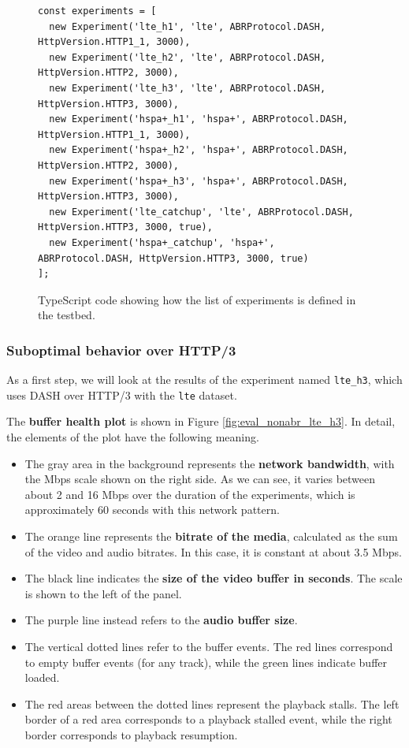 \begin{figure}[h]
    \centering
    \begin{verbatim}
const experiments = [
  new Experiment('lte_h1', 'lte', ABRProtocol.DASH, HttpVersion.HTTP1_1, 3000),
  new Experiment('lte_h2', 'lte', ABRProtocol.DASH, HttpVersion.HTTP2, 3000),
  new Experiment('lte_h3', 'lte', ABRProtocol.DASH, HttpVersion.HTTP3, 3000),
  new Experiment('hspa+_h1', 'hspa+', ABRProtocol.DASH, HttpVersion.HTTP1_1, 3000),
  new Experiment('hspa+_h2', 'hspa+', ABRProtocol.DASH, HttpVersion.HTTP2, 3000),
  new Experiment('hspa+_h3', 'hspa+', ABRProtocol.DASH, HttpVersion.HTTP3, 3000),
  new Experiment('lte_catchup', 'lte', ABRProtocol.DASH, HttpVersion.HTTP3, 3000, true),
  new Experiment('hspa+_catchup', 'hspa+', ABRProtocol.DASH, HttpVersion.HTTP3, 3000, true)
];
    \end{verbatim}
    \caption{TypeScript code showing how the list of experiments is defined in the testbed.}
    \label{fig:experiments1}
\end{figure}

\subsubsection{Suboptimal behavior over HTTP/3}
\label{sec:eval/non-abr/h3-behavior}

As a first step, we will look at the results of the experiment named \texttt{lte\_h3}, which uses DASH over HTTP/3 with the \texttt{lte} dataset.

The \textbf{buffer health plot} is shown in Figure \ref{fig:eval_nonabr_lte_h3}. In detail, the elements of the plot have the following meaning.

\begin{itemize}
    \item The gray area in the background represents the \textbf{network bandwidth}, with the Mbps scale shown on the right side. As we can see, it varies between about 2 and 16 Mbps over the duration of the experiments, which is approximately 60 seconds with this network pattern.
    \item The orange line represents the \textbf{bitrate of the media}, calculated as the sum of the video and audio bitrates. In this case, it is constant at about 3.5 Mbps.
    \item The black line indicates the \textbf{size of the video buffer in seconds}. The scale is shown to the left of the panel.
    \item The purple line instead refers to the \textbf{audio buffer size}.
    \item The vertical dotted lines refer to the buffer events. The red lines correspond to empty buffer events (for any track), while the green lines indicate buffer loaded.
    \item The red areas between the dotted lines represent the playback stalls. The left border of a red area corresponds to a playback stalled event, while the right border corresponds to playback resumption.
\end{itemize}

